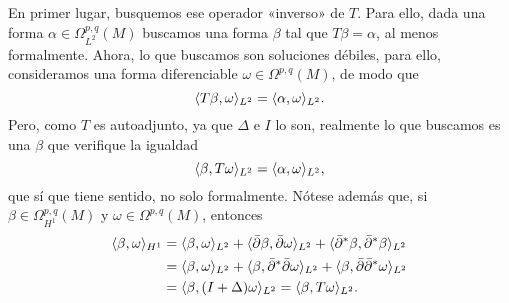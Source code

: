 \documentclass[12pt,a4paper]{article}
\theoremstyle{definition} \newtheorem{defn}[thm]{Definición}
\theoremstyle{definition} \newtheorem{ejemplo}[thm]{Ejemplo}
\theoremstyle{definition} \newtheorem{ejercicio}[thm]{Ejercicio}
\theoremstyle{remark} \newtheorem*{obs}{Observación}
\DeclarePairedDelimiter\esc{\langle}{\rangle}
\newcommand{\dol}{\bar{\partial}}
\begin{document}
    En primer lugar, busquemos ese operador «inverso» de $T$. Para ello, dada una forma $\alpha\in \Omega^{p,q}_{L^2}(M)$ buscamos una forma $\beta$ tal que $T\beta=\alpha$, al menos formalmente. Ahora, lo que buscamos son soluciones débiles, para ello, consideramos una forma diferenciable $\omega\in\Omega^{p,q}(M) $, de modo que
    \begin{equation*}
      \esc{T\beta,\omega}_{L^2}=\esc{\alpha,\omega}_{L^2}.
    \end{equation*}
    Pero, como $T$ es autoadjunto, ya que $\Delta$ e $I$ lo son, realmente lo que buscamos es una $\beta$ que verifique la igualdad
    \begin{equation*}
      \esc{\beta,T\omega}_{L^2}=\esc{\alpha,\omega}_{L^2},
    \end{equation*}
    que sí que tiene sentido, no solo formalmente. Nótese además que, si $\beta \in \Omega^{p,q}_{H^1}(M)$ y $\omega \in \Omega^{p,q}(M)$, entonces
    \begin{align*}
      \esc{\beta,\omega}_{H^1}&=\esc{\beta,\omega}_{L^2}+\esc{\dol \beta,\dol \omega}_{L^2}+ \esc{\dol^*\beta,\dol^*\beta}_{L^2}\\ 
      &=\esc{\beta,\omega}_{L^2} + \esc{\beta,\dol^*\dol \omega}_{L^2}+ \esc{\beta, \dol \dol^* \omega}_{L^2} \\
      &= \esc{\beta,(I+\Delta)\omega}_{L^2}=\esc{\beta,T\omega}_{L^2}.
    \end{align*}
\end{document}
